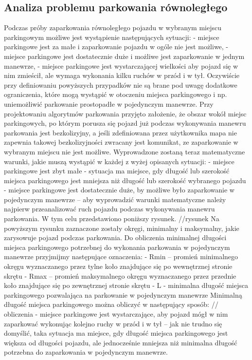 \documentclass[a4paper,11pt,twoside]{report}
\theoremstyle{definition}
\begin{document}
\subsection{Analiza problemu parkowania równoległego}

Podczas próby zaparkowania równoległego pojazdu w wybranym miejscu parkingowym możliwe jest wystąpienie następujących sytuacji:
- miejsce parkingowe jest za małe i zaparkowanie pojazdu w ogóle nie jest możliwe,
- miejsce parkingowe jest dostatecznie duże i możliwe jest zaparkowanie w jednym manewrze,
- miejsce parkingowe jest wystarczającej wielkości aby pojazd się w nim zmieścił, ale wymaga wykonania kilku ruchów w przód i w tył.
Oczywiście przy definiowaniu powyższych przypadków nie są brane pod uwagę dodatkowe ograniczenia, które mogą wystąpić w otoczeniu miejsca parkingowego i np. uniemożliwić parkowanie prostopadłe w pojedynczym manewrze. Przy projektowaniu algorytmów parkowania przyjęto założenie, że obszar wokół miejsc parkingowych, po którym porusza się pojazd już podczas wykonywania manewru parkowania jest bezkolizyjny, a jeśli zdefiniowana przez użytkownika mapa nie zapewnia takowej bezkolizyjności zwracany jest komunikat, ze zaparkowanie w wybranym miejscu nie jest możliwe. 
Wyprowadzone zostaną teraz matematyczne warunki, jakie muszą wystąpić w każdej z wyżej opisanych sytuacji:
- miejsce parkingowe jest zbyt małe - sytuacja ma miejsce, gdy długość lub szerokość miejsca parkingowego jest mniejsza niż długość lub szerokość wybranego pojazdu
- miejsce parkingowe jest dostatecznie duże, by możliwe było zaparkowanie w pojedynczym manewrze – aby wyprowadzić warunki matematyczne należy najpierw przeanalizować ruch pojazdu podczas wykonywania manewru parkowania. W tym celu przedstawiono poniższy rysunek.
//rysunek
Na powyższym rysunku zaznaczone zostały okręgi, minimalny i maksymalny, jakie zarysowuje pojazd podczas parkowania. Do obliczenia minimalnej długości miejsca parkingowego potrzebnej do wykonania parkowania w pojedynczym manewrze przyjmijmy następujące oznaczenia:
- Rmin – promień minimalnego okręgu wyznaczanego przez tylne koło znajdujące się po wewnętrznej stronie skrętu
- Rmax – promień maksymalnego okręgu wyznaczanego przez przednie koło znajdujące się po zewnętrznej stronie skrętu
- L - minimalna długość miejsca parkingowego pozwalająca na parkowanie w pojedynczym manewrze
Minimalną długość miejsca parkingowego można obliczyć w następujący sposób:
// obliczenia
- miejsce parkingowe jest wystarczające, aby pojazd mógł w nim zaparkować wykonując kolejno ruchy w przód i w tył – jak nie trudno się domyślić, taka sytuacja ma miejsce, gdy długość miejsca parkingowego jest większa od długości pojazdu, ale jednocześnie mniejsza niż minimalna długość potrzebna do zaparkowania w pojedynczym manewrze.
\end{document}
